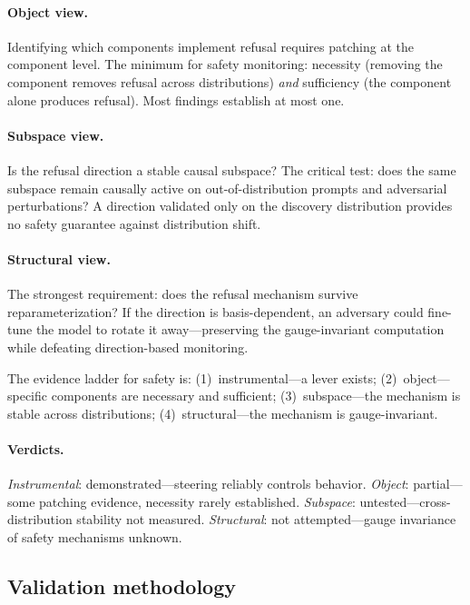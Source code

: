 \documentclass{article}
\begin{document}
\paragraph{Object view.}
Identifying which components implement refusal requires patching at the
component level. The minimum for safety monitoring: necessity (removing
the component removes refusal across distributions) \emph{and}
sufficiency (the component alone produces refusal). Most findings
establish at most one.

\paragraph{Subspace view.}
Is the refusal direction a stable causal subspace? The critical test:
does the same subspace remain causally active on out-of-distribution
prompts and adversarial perturbations? A direction validated only on the
discovery distribution provides no safety guarantee against distribution
shift.

\paragraph{Structural view.}
The strongest requirement: does the refusal mechanism survive
reparameterization? If the direction is basis-dependent, an adversary
could fine-tune the model to rotate it away---preserving the
gauge-invariant computation while defeating direction-based monitoring.

The evidence ladder for safety is: (1)~instrumental---a lever exists;
(2)~object---specific components are necessary and sufficient;
(3)~subspace---the mechanism is stable across distributions;
(4)~structural---the mechanism is gauge-invariant.

\paragraph{Verdicts.}
\emph{Instrumental}: demonstrated---steering reliably controls behavior.
\emph{Object}: partial---some patching evidence, necessity rarely
established.
\emph{Subspace}: untested---cross-distribution stability not measured.
\emph{Structural}: not attempted---gauge invariance of safety mechanisms
unknown.



\subsection{Validation methodology}\label{app:cs_validation}
\end{document}
